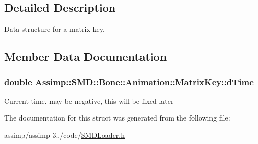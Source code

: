 \subsection{Detailed Description}
Data structure for a matrix key. 

\subsection{Member Data Documentation}
\hypertarget{struct_assimp_1_1_s_m_d_1_1_bone_1_1_animation_1_1_matrix_key_aa756960158d1925452166fe6f06964ea}{
\subsubsection[{d\+Time}]{\setlength{\rightskip}{0pt plus 5cm}double Assimp\+::\+S\+M\+D\+::\+Bone\+::\+Animation\+::\+Matrix\+Key\+::d\+Time}}\label{struct_assimp_1_1_s_m_d_1_1_bone_1_1_animation_1_1_matrix_key_aa756960158d1925452166fe6f06964ea}
Current time. may be negative, this will be fixed later 

The documentation for this struct was generated from the following file\+:\begin{DoxyCompactItemize}
\item 
assimp/assimp-\/3../code/\hyperlink{_s_m_d_loader_8h}{S\+M\+D\+Loader.\+h}\end{DoxyCompactItemize}

